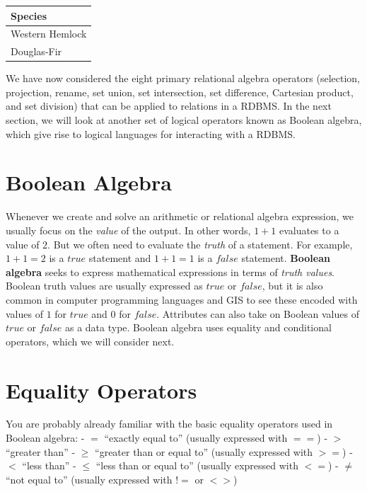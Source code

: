 \documentclass[
]{book}
\begin{document}
\begin{tabular}{l}
\toprule
Species\\
\midrule
Western Hemlock\\
Douglas-Fir\\
\bottomrule
\end{tabular}

We have now considered the eight primary relational algebra operators (selection, projection, rename, set union, set intersection, set difference, Cartesian product, and set division) that can be applied to relations in a RDBMS. In the next section, we will look at another set of logical operators known as Boolean algebra, which give rise to logical languages for interacting with a RDBMS.

\hypertarget{boolean-algebra}{%
\section{Boolean Algebra}\label{boolean-algebra}}

Whenever we create and solve an arithmetic or relational algebra expression, we usually focus on the \emph{value} of the output. In other words, \(1+1\) evaluates to a value of \(2\). But we often need to evaluate the \emph{truth} of a statement. For example, \(1+1=2\) is a \(true\) statement and \(1+1=1\) is a \(false\) statement. \textbf{Boolean algebra} seeks to express mathematical expressions in terms of \emph{truth values}. Boolean truth values are usually expressed as \(true\) or \(false\), but it is also common in computer programming languages and GIS to see these encoded with values of \(1\) for \(true\) and \(0\) for \(false\). Attributes can also take on Boolean values of \(true\) or \(false\) as a data type. Boolean algebra uses equality and conditional operators, which we will consider next.

\hypertarget{equality-operators}{%
\section{Equality Operators}\label{equality-operators}}

You are probably already familiar with the basic equality operators used in Boolean algebra:
- \(=\) ``exactly equal to'' (usually expressed with \(==\))
- \(>\) ``greater than''
- \(≥\) ``greater than or equal to'' (usually expressed with \(>=\))
- \(<\) ``less than''
- \(≤\) ``less than or equal to'' (usually expressed with \(<=\))
- \(≠\) ``not equal to'' (usually expressed with \(!=\) or \(<>\))
\end{document}
